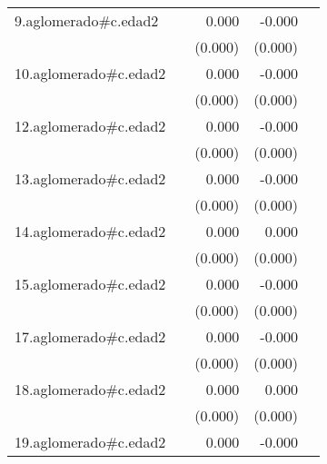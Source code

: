 {\begin{longtable}{l*{4}{D{.}{.}{-1}}}
\addlinespace
9.aglomerado#c.edad2&                     &       0.000         &      -0.000         &                     \\
            &                     &     (0.000)         &     (0.000)         &                     \\
\addlinespace
10.aglomerado#c.edad2&                     &       0.000         &      -0.000\sym{**} &                     \\
            &                     &     (0.000)         &     (0.000)         &                     \\
\addlinespace
12.aglomerado#c.edad2&                     &       0.000         &      -0.000         &                     \\
            &                     &     (0.000)         &     (0.000)         &                     \\
\addlinespace
13.aglomerado#c.edad2&                     &       0.000\sym{*}  &      -0.000         &                     \\
            &                     &     (0.000)         &     (0.000)         &                     \\
\addlinespace
14.aglomerado#c.edad2&                     &       0.000\sym{*}  &       0.000         &                     \\
            &                     &     (0.000)         &     (0.000)         &                     \\
\addlinespace
15.aglomerado#c.edad2&                     &       0.000         &      -0.000         &                     \\
            &                     &     (0.000)         &     (0.000)         &                     \\
\addlinespace
17.aglomerado#c.edad2&                     &       0.000         &      -0.000         &                     \\
            &                     &     (0.000)         &     (0.000)         &                     \\
\addlinespace
18.aglomerado#c.edad2&                     &       0.000\sym{*}  &       0.000         &                     \\
            &                     &     (0.000)         &     (0.000)         &                     \\
\addlinespace
19.aglomerado#c.edad2&                     &       0.000         &      -0.000         &                     \\

\end{longtable}}
